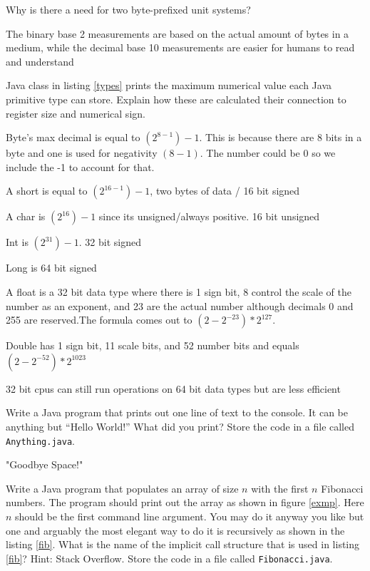 \documentclass{homework}
\newcommand\callit[1]{Store the code in a file called \texttt{#1}.}
\begin{document}
Why is there a need for two byte-prefixed unit systems?\smallbreak
\begin{sol}
The binary base 2 measurements are based on the actual amount of bytes in a medium, while the decimal base 10 measurements are easier for humans to read and understand
\end{sol}

\question Java class in listing \ref{types} prints the maximum numerical
value each Java primitive type can store. Explain how these are
calculated \ie their connection to register size and numerical
sign. \bigbreak

\begin{sol}
Byte's max decimal is equal to $(2^{8-1})-1$. This is because there are 8 bits in a byte and one is used for
negativity $(8-1)$. The number could be 0 so we include the -1 to account for that. \bigbreak

A short is equal to $(2^{16-1})-1$, two bytes of data / 16 bit signed \bigbreak

A char is $(2^{16})-1$ since its unsigned/always positive. 16 bit unsigned \bigbreak

Int is $(2^{31})-1$. 32 bit signed \bigbreak

Long is 64 bit signed \bigbreak

A float is a 32 bit data type where there is 1 sign bit, 8 control the scale of the number as an exponent, 
and 23 are the actual number although decimals 0 and 255 are reserved.The formula comes out to 
$(2-2^{-23})*2^{127}$. \bigbreak

Double has 1 sign bit, 11 scale bits, and 52 number bits and equals $(2-2^{-52})*2^{1023}$ \bigbreak

32 bit cpus can still run operations on 64 bit data types but are less efficient
\end{sol}

% 

\question Write a Java program that prints out one line of text to the
console. It can be anything but ``Hello World!'' What did you
print? \callit{Anything.java}

\begin{sol}
  "Goodbye Space!"
\end{sol}

\question Write a Java program that populates an array of size $n$ with the
first $n$ Fibonacci numbers. The program should print out the
array as shown in figure \ref{exmp}. Here $n$ should be the first
command line argument. You may do it anyway you like but one and
arguably the most elegant way to do it is recursively as shown in
the listing \ref{fib}. What is the name of the implicit call
structure that is used in listing \ref{fib}? Hint: Stack Overflow.
\callit{Fibonacci.java}
\end{document}

